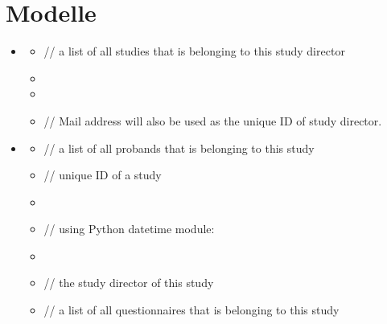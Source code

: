 \documentclass[a4paper]{scrreprt}
\begin{document}
        \section{Modelle}
            \begin{itemize}
                \item {}
                    \begin{itemize}
                        \item {}
                            \par // a list of all studies that is belonging to this study director
                        \item {}
                        \item {}
                        \item {}
                            \par // Mail address will also be used as the unique ID of study director.
                    \end{itemize}

                    \item {}
                        \begin{itemize}
                            \item {}
                                \par // a list of all probands that is belonging to this study
                            \item {}
                                \par // unique ID of a study
                            \item {}
                            \item {}
                                \par // using Python datetime module: 
                            \item {}
                            \item {}
                                \par // the study director of this study
                            \item {}
                                \par // a list of all questionnaires that is belonging to this study
                        \end{itemize}


\end{itemize}
\end{document}
